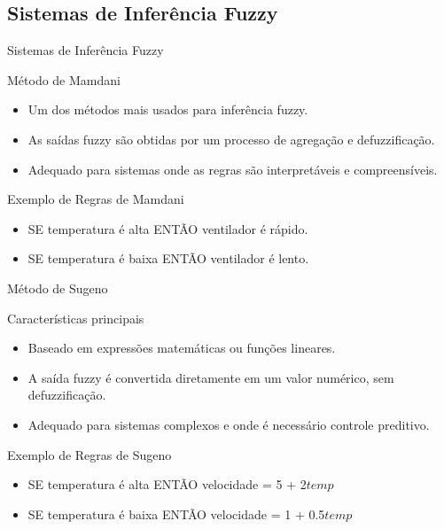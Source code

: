 \documentclass[aspectratio=169]{beamer}
\begin{document}
\subsection{Sistemas de Inferência Fuzzy}
\begin{frame}{Sistemas de Inferência Fuzzy}
    \begin{block}{Método de Mamdani}

        \begin{itemize}
            \item Um dos métodos mais usados para inferência fuzzy.
            \item As saídas fuzzy são obtidas por um processo de agregação e defuzzificação.
            \item Adequado para sistemas onde as regras são interpretáveis e compreensíveis.
        \end{itemize}
    \end{block}
    \begin{block}{Exemplo de Regras de Mamdani}
        \begin{itemize}
            \item SE temperatura é alta ENTÃO ventilador é rápido.
            \item SE temperatura é baixa ENTÃO ventilador é lento.
        \end{itemize}
    \end{block}
\end{frame}

\begin{frame}{Método de Sugeno}
    \begin{block}{Características principais}

        \begin{itemize}
            \item Baseado em expressões matemáticas ou funções lineares.
            \item A saída fuzzy é convertida diretamente em um valor numérico, sem defuzzificação.
            \item Adequado para sistemas complexos e onde é necessário controle preditivo.
        \end{itemize}
    \end{block}
    \begin{block}{Exemplo de Regras de Sugeno}
        \begin{itemize}
            \item SE temperatura é alta ENTÃO velocidade = 5 + 2\(temp\)
            \item SE temperatura é baixa ENTÃO velocidade = 1 + 0.5\(temp\)
        \end{itemize}
    \end{block}
\end{frame}
\end{document}
